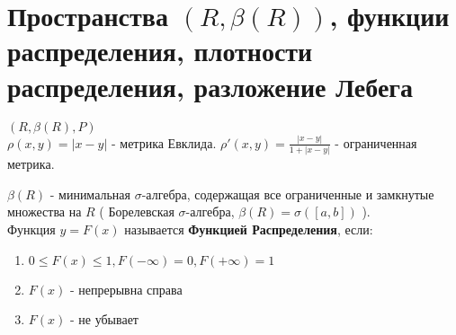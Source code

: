\section{Пространства $(R, \beta (R))$, функции распределения, плотности распределения, разложение Лебега}
$(R, \beta(R), P)$\\
$\rho(x, y) = |x-y|$ -  метрика Евклида. $\rho'(x, y) = \frac{|x-y|}{1+|x-y|}$ - ограниченная метрика.

$\beta (R)$ - минимальная $\sigma$-алгебра, содержащая все ограниченные и замкнутые множества на $R$ ( Борелевская $\sigma$-алгебра, $\beta (R) = \sigma ([a, b])$ ).\\

Функция $y = F(x)$ называется \textbf{Функцией Распределения}, если:
\begin{enumerate}
 \item $0 \leqslant F(x) \leqslant 1, F(-\infty) = 0, F(+\infty) = 1$
 \item $F(x)$ - непрерывна справа
 \item $F(x)$ - не убывает
\end{enumerate}

